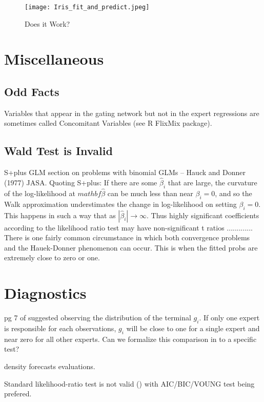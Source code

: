 \documentclass[12pt]{article}
\begin{document}
\begin{figure}[ht]
  \centering
  \texttt{[image: Iris\_fit\_and\_predict.jpeg]}
  \caption{Does it Work?}
  \label{fig:Iris_fit_and_predict}
\end{figure}


\section{Miscellaneous}

\subsection{Odd Facts}

Variables that appear in the gating network but not in the expert regressions
are sometimes called Concomitant Variables (see R FlixMix package).

\subsection{Wald Test is Invalid}
S+plus GLM section on problems with binomial GLMs
  -- Hauck and Donner (1977) JASA. Quoting S+plus: If there are
  some $\hat{\beta}_{i}$ that are large, the curvature of the log-likelihood at
  $mathbf{\hat{\beta}}$ can be much less than near $\beta_{i}=0$, and so the Walk
  approximation understimates the change in log-likelihood on setting $\beta_{i}=0$.
  This happens in such a way that as $|\hat{\beta}_{i}| \rightarrow \infty$. Thus
  highly significant coefficients according to the likelihood ratio test may have
  non-significant t ratios ............. There is one fairly common circumstance
  in which both convergence problems and the Hauek-Donner phenomenon can occur.
  This is when the fitted probs are extremely close to zero or one.



\section{Diagnostics}
pg 7 of \cite{WMS1995} suggested observing the distribution of the terminal
$g_{i}$. If only one expert is responsible for each observations, $g_{i}$ will
be close to one for a single expert and near zero for all other experts.
Can we formalize this comparison in to a specific test?

density forecasts evaluations.

Standard likelihood-ratio test is not valid (\cite{CarvalhoTanner2006}) with
AIC/BIC/VOUNG test being prefered.



\printbibliography
\end{document}
